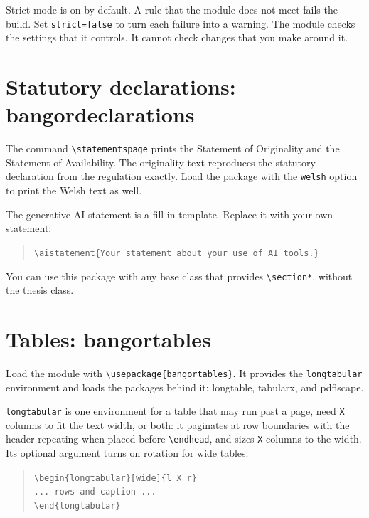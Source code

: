 \documentclass[a4paper,12pt]{article}
\begin{document}
Strict mode is on by default. A rule that the module does not meet
fails the build. Set \verb|strict=false| to turn each failure into a
warning. The module checks the settings that it controls. It cannot
check changes that you make around it.

\section{Statutory declarations: bangordeclarations}
The command \verb|\statementspage| prints the Statement of Originality
and the Statement of Availability. The originality text reproduces the
statutory declaration from the regulation exactly. Load the package
with the \verb|welsh| option to print the Welsh text as well.

The generative AI statement is a fill-in template. Replace it with your
own statement:

\begin{quote}
  \verb|\aistatement{Your statement about your use of AI tools.}|
\end{quote}

You can use this package with any base class that provides
\verb|\section*|, without the thesis class.

\section{Tables: bangortables}
Load the module with \verb|\usepackage{bangortables}|. It provides the
\verb|longtabular| environment and loads the packages behind it:
\textsf{longtable}, \textsf{tabularx}, and \textsf{pdflscape}.

\verb|longtabular| is one environment for a table that may run past a
page, need \verb|X| columns to fit the text width, or both: it paginates
at row boundaries with the header repeating when placed before
\verb|\endhead|, and sizes \verb|X| columns to the width. Its optional
argument turns on rotation for wide tables:

\begin{quote}
  \verb|\begin{longtabular}[wide]{l X r}| \\ \verb|... rows and caption ...| \\ \verb|\end{longtabular}|
\end{quote}
\end{document}
